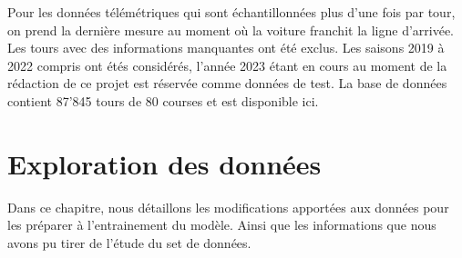 Pour les données télémétriques qui sont échantillonnées plus d'une fois par tour,
on prend la dernière mesure au moment où la voiture franchit la ligne d'arrivée.
Les tours avec des informations manquantes ont été exclus.
Les saisons 2019 à 2022 compris ont étés considérés, l'année 2023 étant en cours au moment de la rédaction de ce projet
est réservée comme données de test. La base de données contient 87'845 tours de 80 courses et est disponible ici. %

\section{Exploration des données}
Dans ce chapitre, nous détaillons les modifications apportées aux données pour les préparer à l'entrainement du modèle.
Ainsi que les informations que nous avons pu tirer de l'étude du set de données.

